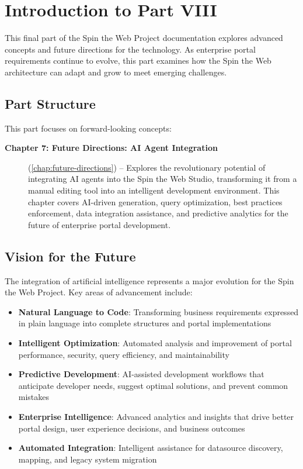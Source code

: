 
\chapter*{Introduction to Part VIII}

This final part of the Spin the Web Project documentation explores advanced concepts and future directions for the technology. As enterprise portal requirements continue to evolve, this part examines how the Spin the Web architecture can adapt and grow to meet emerging challenges.

\section*{Part Structure}

This part focuses on forward-looking concepts:

\begin{description}
\item[\textbf{Chapter 7: Future Directions: AI Agent Integration}] (\cref{chap:future-directions}) -- Explores the revolutionary potential of integrating AI agents into the Spin the Web Studio, transforming it from a manual editing tool into an intelligent development environment. This chapter covers AI-driven \wbdl{} generation, query optimization, best practices enforcement, data integration assistance, and predictive analytics for the future of enterprise portal development.
\end{description}

\section*{Vision for the Future}

The integration of artificial intelligence represents a major evolution for the Spin the Web Project. Key areas of advancement include:

\begin{itemize}
\item \textbf{Natural Language to Code}: Transforming business requirements expressed in plain language into complete \wbdl{} structures and portal implementations
\item \textbf{Intelligent Optimization}: Automated analysis and improvement of portal performance, security, query efficiency, and maintainability
\item \textbf{Predictive Development}: AI-assisted development workflows that anticipate developer needs, suggest optimal solutions, and prevent common mistakes
\item \textbf{Enterprise Intelligence}: Advanced analytics and insights that drive better portal design, user experience decisions, and business outcomes
\item \textbf{Automated Integration}: Intelligent assistance for datasource discovery, mapping, and legacy system migration
\end{itemize}

